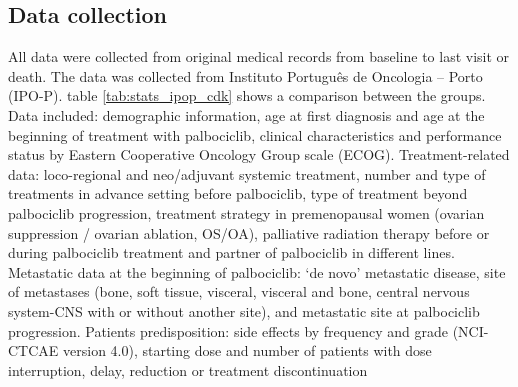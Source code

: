 
\subsection{Data collection}
All data were collected from original medical records from baseline to last visit or death.
The data was collected from  Instituto Português de Oncologia – Porto (IPO-P).  table \ref{tab:stats_ipop_cdk} shows a comparison between the groups.
Data included: demographic information, age at first diagnosis and age at the beginning of treatment with palbociclib, clinical characteristics and performance status by Eastern Cooperative Oncology Group scale (ECOG). Treatment-related data: loco-regional and neo/adjuvant systemic treatment, number and type of treatments in advance setting before palbociclib, type of treatment beyond palbociclib progression, treatment strategy in premenopausal women (ovarian suppression / ovarian ablation, OS/OA), palliative radiation therapy before or during palbociclib treatment and partner of palbociclib in different lines. Metastatic data at the beginning of palbociclib: ‘de novo’ metastatic disease, site of metastases (bone, soft tissue, visceral, visceral and bone, central nervous system-CNS with or without another site), and metastatic site at palbociclib progression. Patients predisposition: side effects by frequency and grade (NCI-CTCAE version 4.0), starting dose and number of patients with dose interruption, delay, reduction or treatment discontinuation


